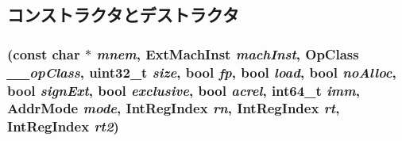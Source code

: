 \subsection{コンストラクタとデストラクタ}
\hypertarget{classArmISA_1_1PairMemOp_a5bba341210b26c5e58c4672b264c3e1a}{
\subsubsection[{PairMemOp}]{ (const char $\ast$ {\em mnem}, \/  {\bf ExtMachInst} {\em machInst}, \/  OpClass {\em \_\-\_\-opClass}, \/  {\bf uint32\_\-t} {\em size}, \/  bool {\em fp}, \/  bool {\em load}, \/  bool {\em noAlloc}, \/  bool {\em signExt}, \/  bool {\em exclusive}, \/  bool {\em acrel}, \/  int64\_\-t {\em imm}, \/  {\bf AddrMode} {\em mode}, \/  {\bf IntRegIndex} {\em rn}, \/  {\bf IntRegIndex} {\em rt}, \/  {\bf IntRegIndex} {\em rt2})}}
\label{classArmISA_1_1PairMemOp_a5bba341210b26c5e58c4672b264c3e1a}



